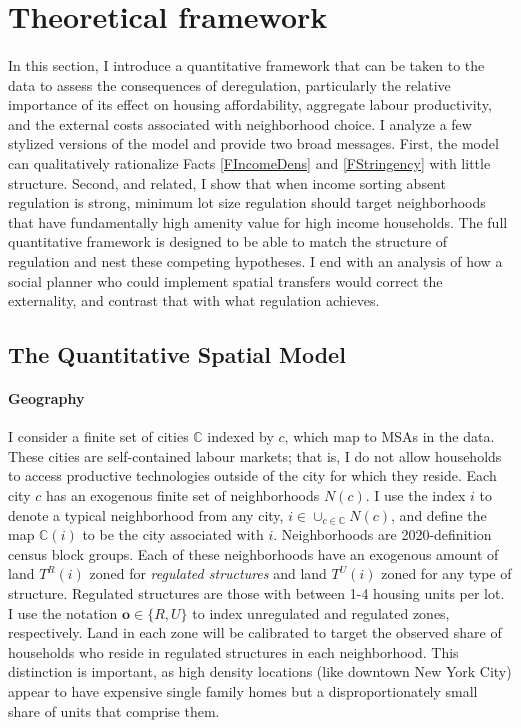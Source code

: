 \documentclass[12pt]{article}
\begin{document}
\section{Theoretical framework}\label{Section:Model}
	
	\paragraph*{}
	In this section, I introduce a quantitative framework that can be taken to the data to assess the consequences of deregulation, particularly the relative importance of its effect on housing affordability, aggregate labour productivity, and the external costs associated with neighborhood choice. I analyze a few stylized versions of the model and provide two broad messages. First, the model can qualitatively rationalize Facts \ref{FIncomeDens} and \ref{FStringency} with little structure. Second, and related, I show that when income sorting absent regulation is strong, minimum lot size regulation should target neighborhoods that have fundamentally high amenity value for high income households. The full quantitative framework is designed to be able to match the structure of regulation and nest these competing hypotheses. I end with an analysis of how a social planner who could implement spatial transfers would correct the externality, and contrast that with what regulation achieves.  
	
	\subsection{The Quantitative Spatial Model}
	
	\paragraph*{Geography}
	I consider a finite set of cities $\mathbb{C}$ indexed by $c$, which map to MSAs in the data. These cities are self-contained labour markets; that is, I do not allow households to access productive technologies outside of the city for which they reside. Each city $c$ has an exogenous finite set of neighborhoods $N(c)$. I use the index $i$ to denote a typical neighborhood from any city, $i \in \cup_{c \in \mathbb{C}}N(c)$, and define the map $\mathbb{C}(i)$ to be the city associated with $i$. Neighborhoods are 2020-definition census block groups. Each of these neighborhoods have an exogenous amount of land $T^{R}(i)$ zoned for \textit{regulated structures} and land $T^{U}(i)$ zoned for any type of structure. Regulated structures are those with between 1-4 housing units per lot. I use the notation $\boldsymbol{o} \in \{R, U\}$ to index unregulated and regulated zones, respectively. Land in each zone will be calibrated to target the observed share of households who reside in regulated structures in each neighborhood. This distinction is important, as high density locations (like downtown New York City) appear to have expensive single family homes but a disproportionately small share of units that comprise them.
\end{document}
